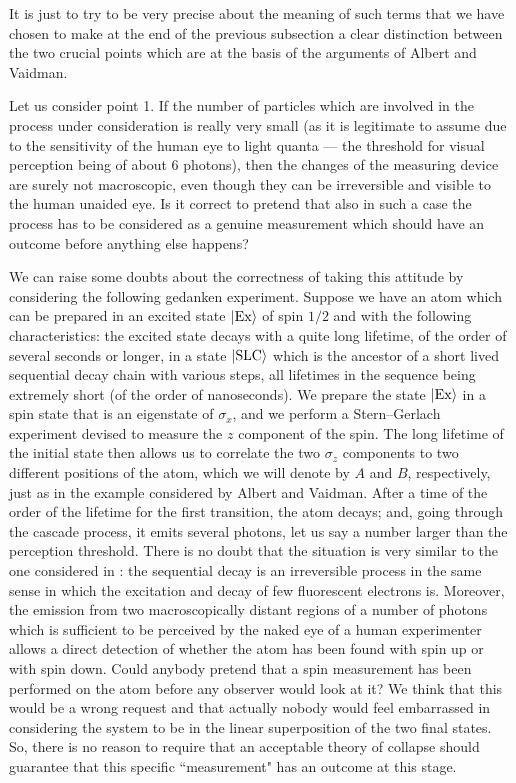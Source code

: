 \documentclass[10pt,a4paper]{article}
\begin{document}
It is just to try to be very precise about the meaning of such
terms that we have chosen to make at the end of the previous
subsection a clear distinction between the two crucial points
which are at the basis of the arguments of Albert and Vaidman.

Let us consider point 1. If the number of particles which are
involved in the process under consideration is really very small
(as it is legitimate to assume due to the sensitivity of the human
eye to light quanta --- the threshold for visual perception being
of about 6 photons), then the changes of the measuring device are
surely not macroscopic, even though they can be irreversible and
visible to the human unaided eye. Is it correct to pretend that
also in such a case the process has to be considered as a genuine
measurement which should have an outcome before anything else
happens?

We can raise some doubts about the correctness of taking this
attitude by considering the following gedanken experiment. Suppose
we have an atom which can be prepared in an excited state
$|\makebox{Ex}\rangle$ of spin $1/2$ and with the following
characteristics: the excited state decays with a quite long
lifetime, of the order of several seconds or longer, in a state
$|\makebox{SLC}\rangle$ which is the ancestor of a short lived
sequential decay chain with various steps, all lifetimes in the
sequence being extremely short (of the order of nanoseconds). We
prepare the state $|\makebox{Ex}\rangle$ in a spin state that is
an eigenstate of $\sigma_{x}$, and we perform a Stern--Gerlach
experiment devised to measure the $z$ component of the spin. The
long lifetime of the initial state then allows us to correlate the
two $\sigma_{z}$ components to two different positions of the
atom, which we will denote by $A$ and $B$, respectively, just as
in the example considered by Albert and Vaidman. After a time of
the order of the lifetime for the first transition, the atom
decays; and, going through the cascade process, it emits several
photons, let us say a number larger than the perception threshold.
There is no doubt that the situation is very similar to the one
considered in \cite{avp}: the sequential decay is an irreversible
process in the same sense in which the excitation and decay of few
fluorescent electrons is. Moreover, the emission from two
macroscopically distant regions of a number of photons which is
sufficient to be perceived by the naked eye of a human
experimenter allows a direct detection of whether the atom has
been found with spin up or with spin down. Could anybody pretend
that a spin measurement has been performed on the atom before any
observer would look at it? We think that this would be a wrong
request and that actually nobody would feel embarrassed in
considering the system to be in the linear superposition of the
two final states. So, there is no reason to require that an
acceptable theory of collapse should guarantee that this specific
``measurement" has an outcome at this stage.
\end{document}

